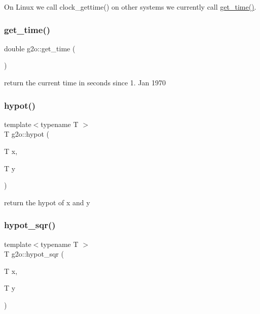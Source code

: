 On Linux we call clock\+\_\+gettime() on other systems we currently call \mbox{\hyperlink{namespaceg2o_a6baa8fdfd973b5b970df14f14fd5d844}{get\+\_\+time()}}. \mbox{\label{namespaceg2o_a6baa8fdfd973b5b970df14f14fd5d844}} 
\subsubsection{\texorpdfstring{get\+\_\+time()}{get\_time()}}
{\footnotesize\ttfamily double g2o\+::get\+\_\+time (\begin{DoxyParamCaption}{ }\end{DoxyParamCaption})\hspace{0.3cm}{\ttfamily [inline]}}

return the current time in seconds since 1. Jan 1970 \mbox{\label{namespaceg2o_a586ee8937cdc8de49303abd1611da387}} 
\subsubsection{\texorpdfstring{hypot()}{hypot()}}
{\footnotesize\ttfamily template$<$typename T $>$ \\
T g2o\+::hypot (\begin{DoxyParamCaption}\item[{T}]{x,  }\item[{T}]{y }\end{DoxyParamCaption})\hspace{0.3cm}{\ttfamily [inline]}}

return the hypot of x and y \mbox{\label{namespaceg2o_ac2989135761e62b40066193a11950d21}} 
\subsubsection{\texorpdfstring{hypot\+\_\+sqr()}{hypot\_sqr()}}
{\footnotesize\ttfamily template$<$typename T $>$ \\
T g2o\+::hypot\+\_\+sqr (\begin{DoxyParamCaption}\item[{T}]{x,  }\item[{T}]{y }\end{DoxyParamCaption})\hspace{0.3cm}{\ttfamily [inline]}}

